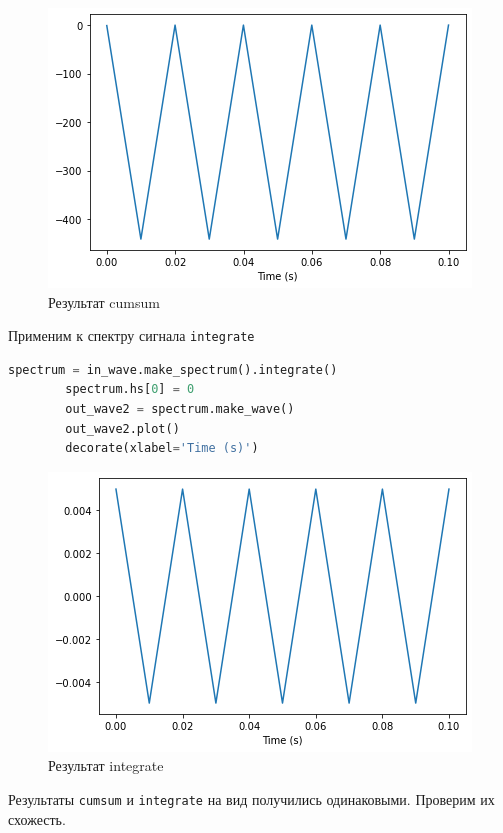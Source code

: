 \documentclass[a4paper, 14pt]{extarticle}
\begin{document}
    \begin{figure}[H]
        \centering
        \includegraphics[width=0.8\linewidth]{square_cumsum}
        \caption{Результат cumsum}
        \label{fig:square_cumsum}
    \end{figure}

    Применим к спектру сигнала \texttt{integrate}

    \begin{lstlisting}[language=Python, caption= Применение integrate к спектру сигнала, label={lst:square_signal_spectrum_integrate}]
        spectrum = in_wave.make_spectrum().integrate()
        spectrum.hs[0] = 0
        out_wave2 = spectrum.make_wave()
        out_wave2.plot()
        decorate(xlabel='Time (s)')
    \end{lstlisting}

    \begin{figure}[H]
        \centering
        \includegraphics[width=0.8\linewidth]{square_integrate}
        \caption{Результат integrate}
        \label{fig:square_integrate}
    \end{figure}

    Результаты \texttt{cumsum} и \texttt{integrate} на вид получились одинаковыми.
    Проверим их схожесть.
\end{document}

